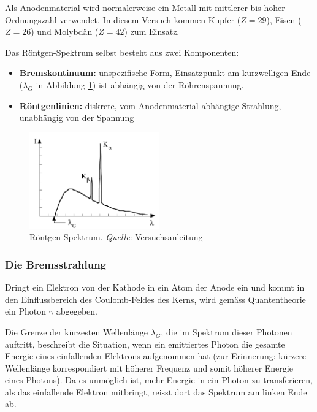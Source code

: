 Als  Anodenmaterial wird  normalerweise  ein Metall  mit  mittlerer bis  hoher
Ordnungszahl verwendet. In diesem Versuch kommen  Kupfer ($Z = 29$), Eisen ($Z
= 26$) und Molybd\"an ($Z = 42$) zum Einsatz.

\clearpage
Das R\"ontgen-Spektrum selbst besteht aus zwei Komponenten:
\begin{itemize}
    \item
        \textbf{Bremskontinuum:}    unspezifische   Form,    Einsatzpunkt   am
        kurzwelligen Ende ($\lambda_G$ in Abbildung \ref{fig:rontgenSpektrum})
        ist abh\"angig von der R\"ohrenspannung.
    \item
        \textbf{R\"ontgenlinien:}  diskrete,  vom  Anodenmaterial  abh\"angige
        Strahlung, unabh\"angig von der Spannung
\end{itemize}

\begin{figure}[h!]
    \centering
    \includegraphics[width=0.5\textwidth]{images/rontgen-spektrum.png}
    \caption{%
        R\"ontgen-Spektrum. \emph{Quelle}: Versuchsanleitung
    }
    \label{fig:rontgenSpektrum}
\end{figure}

\subsubsection{Die Bremsstrahlung}
\label{subsubsec:bremsstrahlung}

Dringt ein Elektron von der Kathode in ein Atom der Anode ein und kommt in den
Einflussbereich des Coulomb-Feldes des Kerns, wird gem\"ass Quantentheorie ein
Photon $\gamma$ abgegeben.

Die Grenze der  k\"urzesten Wellenl\"ange $\lambda_G$, die  im Spektrum dieser
Photonen auftritt, beschreibt  die Situation, wenn ein  emittiertes Photon die
gesamte Energie eines einfallenden  Elektrons aufgenommen hat (zur Erinnerung:
k\"urzere  Wellenl\"ange  korrespondiert  mit  h\"oherer  Frequenz  und  somit
h\"oherer Energie eines  Photons). Da es unm\"oglich ist, mehr  Energie in ein
Photon zu transferieren,  als das einfallende Elektron  mitbringt, reisst dort
das Spektrum am linken Ende ab.

